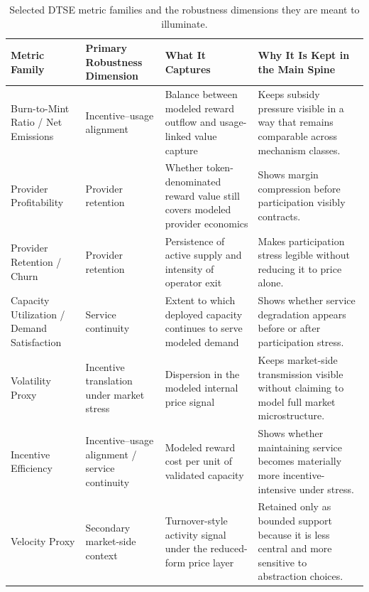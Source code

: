 \begin{table}[H]
    \centering
    \footnotesize
    \setlength{\tabcolsep}{4pt}
    \renewcommand{\arraystretch}{1.1}
    \begin{tabularx}{\textwidth}{@{}>{\raggedright\arraybackslash}p{}>{\raggedright\arraybackslash}p{}>{\raggedright\arraybackslash}p{}X@{}}
        \toprule
        \textbf{Metric Family} & \textbf{Primary Robustness Dimension} & \textbf{What It Captures} & \textbf{Why It Is Kept in the Main Spine} \\
        \midrule
        Burn-to-Mint Ratio / Net Emissions & Incentive--usage alignment & Balance between modeled reward outflow and usage-linked value capture & Keeps subsidy pressure visible in a way that remains comparable across mechanism classes. \\
        \addlinespace
        Provider Profitability & Provider retention & Whether token-denominated reward value still covers modeled provider economics & Shows margin compression before participation visibly contracts. \\
        \addlinespace
        Provider Retention / Churn & Provider retention & Persistence of active supply and intensity of operator exit & Makes participation stress legible without reducing it to price alone. \\
        \addlinespace
        Capacity Utilization / Demand Satisfaction & Service continuity & Extent to which deployed capacity continues to serve modeled demand & Shows whether service degradation appears before or after participation stress. \\
        \addlinespace
        Volatility Proxy & Incentive translation under market stress & Dispersion in the modeled internal price signal & Keeps market-side transmission visible without claiming to model full market microstructure. \\
        \addlinespace
        Incentive Efficiency & Incentive--usage alignment / service continuity & Modeled reward cost per unit of validated capacity & Shows whether maintaining service becomes materially more incentive-intensive under stress. \\
        \addlinespace
        Velocity Proxy & Secondary market-side context & Turnover-style activity signal under the reduced-form price layer & Retained only as bounded support because it is less central and more sensitive to abstraction choices. \\
        \bottomrule
    \end{tabularx}
    \caption[DTSE metric selection]{Selected DTSE metric families and the robustness dimensions they are meant to illuminate.}
    \label{tab:dtse_metric_contract}
\end{table}

